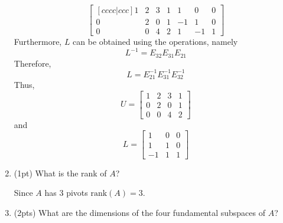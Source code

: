 \begin{enumerate}[label=(\alph*)]
\begin{mdframed}[style=MyFrame]
\begin{equation}
                \begin{bmatrix}[cccc|ccc]
                    1   &   2   &   3   &   1   &   1   &   0   &   0   \\
                    0   &   2   &   0   &   1   &   -1  &   1   &   0   \\
                    0   &   0   &   4   &   2   &   1   &   -1  &   1   
                \end{bmatrix}
            \end{equation}
            Furthermore, $L$ can be obtained using the operations, namely
            \begin{equation}
                L^{-1} = E_{32}E_{31}E_{21}
            \end{equation}
            Therefore,
            \begin{equation}
                L = E_{21}^{-1} E_{31}^{-1} E_{32}^{-1}
            \end{equation}
            Thus,
            \begin{equation}
                U = 
                \begin{bmatrix}
                    1   &   2   &   3   &   1   \\
                    0   &   2   &   0   &   1   \\
                    0   &   0   &   4   &   2
                \end{bmatrix}
            \end{equation}
            and 
            \begin{equation}
                L =
                \begin{bmatrix}
                    1   &   0   &   0   \\
                    1   &   1   &   0   \\
                    -1  &   1   &   1
                \end{bmatrix}
            \end{equation}
        \end{mdframed}
    \item (1pt) What is the rank of $A$?
        \begin{mdframed}
            Since $A$ has 3 pivots $\text{rank}(A)=3$.
        \end{mdframed}
    \item (2pts) What are the dimensions of the four fundamental subspaces
        of $A$?
        \begin{mdframed}[style=MyFrame]
            \begin{equation}

\end{equation}
\end{mdframed}
\end{enumerate}
